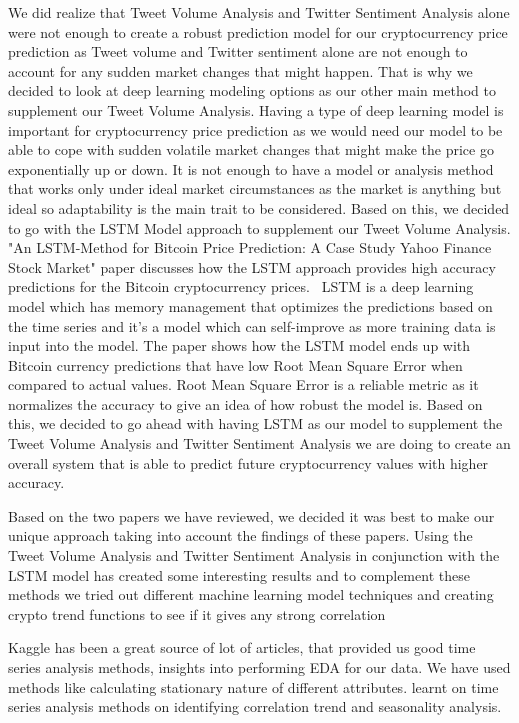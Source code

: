\documentclass[final]{cvpr}
\begin{document}
\par We did realize that Tweet Volume Analysis and Twitter Sentiment Analysis alone were not enough to create a robust prediction model for our cryptocurrency price prediction as Tweet volume and Twitter sentiment alone are not enough to account for any sudden market changes that might happen. That is why we decided to look at deep learning modeling options as our other main method to supplement our Tweet Volume Analysis. Having a type of deep learning model is important for cryptocurrency price prediction as we would need our model to be able to cope with sudden volatile market changes that might make the price go exponentially up or down. It is not enough to have a model or analysis method that works only under ideal market circumstances as the market is anything but ideal so adaptability is the main trait to be considered. Based on this, we decided to go with the LSTM Model approach to supplement our Tweet Volume Analysis. "An LSTM-Method for Bitcoin Price Prediction: A Case Study Yahoo Finance Stock Market" paper discusses how the LSTM approach provides high accuracy predictions for the Bitcoin cryptocurrency prices.~\cite{inproceedings} LSTM is a deep learning model which has memory management that optimizes the predictions based on the time series and it's a model which can self-improve as more training data is input into the model. The paper shows how the LSTM model ends up with Bitcoin currency predictions that have low Root Mean Square Error when compared to actual values. Root Mean Square Error is a reliable metric as it normalizes the accuracy to give an idea of how robust the model is. Based on this, we decided to go ahead with having LSTM as our model to supplement the Tweet Volume Analysis and Twitter Sentiment Analysis we are doing to create an overall system that is able to predict future cryptocurrency values with higher accuracy.~\cite{inproceedings}

\par Based on the two papers we have reviewed, we decided it was best to make our unique approach taking into account the findings of these papers. Using the Tweet Volume Analysis and Twitter Sentiment Analysis in conjunction with the LSTM model has created some interesting results and to complement these methods we tried out different machine learning model techniques and creating crypto trend functions to see if it gives any strong correlation

Kaggle has been a great source of lot of articles, that provided us good time series analysis methods, insights into performing EDA for our data. We have used methods like calculating stationary nature of different attributes. learnt on time series analysis methods on identifying correlation trend and seasonality analysis.\cite{kaggle}
\end{document}
